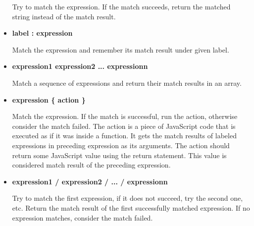 \begin{itemize}
Try to match the expression. If the match succeeds, return the matched string instead of the match result.
\item\textbf{label : expression}

Match the expression and remember its match result under given label.
\item\textbf{expression1 expression2 ... expressionn}

Match a sequence of expressions and return their match results in an array.
\item\textbf{expression \{ action \}}

Match the expression. If the match is successful, run the action, otherwise consider the match failed. The action is a piece of JavaScript code that is executed as if it was inside a function. It gets the match results of labeled expressions in preceding expression as its arguments. The action should return some JavaScript value using the return statement. This value is considered match result of the preceding expression.
\item\textbf{expression1 / expression2 / ... / expressionn}

Try to match the first expression, if it does not succeed, try the second one, etc. Return the match result of the first successfully matched expression. If no expression matches, consider the match failed.
\end{itemize}


